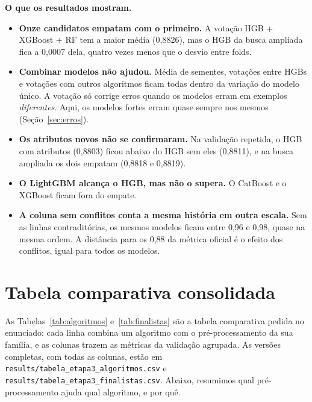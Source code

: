 \documentclass[11pt,a4paper]{article}
\begin{document}
\textbf{O que os resultados mostram.}
\begin{itemize}
\item \textbf{Onze candidatos empatam com o primeiro.} A votação HGB + XGBoost + RF tem a maior média (0,8826), mas o HGB da busca ampliada fica a 0,0007 dela, quatro vezes menos que o desvio entre folds.
\item \textbf{Combinar modelos não ajudou.} Média de sementes, votações entre HGBs e votações com outros algoritmos ficam todas dentro da variação do modelo único. A votação só corrige erros quando os modelos erram em exemplos \emph{diferentes}. Aqui, os modelos fortes erram quase sempre nos mesmos (Seção~\ref{sec:erros}).
\item \textbf{Os atributos novos não se confirmaram.} Na validação repetida, o HGB com atributos (0,8803) ficou abaixo do HGB sem eles (0,8811), e na busca ampliada os dois empatam (0,8818 e 0,8819).
\item \textbf{O LightGBM alcança o HGB, mas não o supera.} O CatBoost e o XGBoost ficam fora do empate.
\item \textbf{A coluna sem conflitos conta a mesma história em outra escala.} Sem as linhas contraditórias, os mesmos modelos ficam entre 0,96 e 0,98, quase na mesma ordem. A distância para os 0,88 da métrica oficial é o efeito dos conflitos, igual para todos os modelos.
\end{itemize}

\section{Tabela comparativa consolidada}

As Tabelas~\ref{tab:algoritmos} e~\ref{tab:finalistas} são a tabela comparativa pedida no enunciado: cada linha combina um algoritmo com o pré-processamento da sua família, e as colunas trazem as métricas da validação agrupada. As versões completas, com todas as colunas, estão em \texttt{results/tabela\_etapa3\_algoritmos.csv} e \texttt{results/tabela\_etapa3\_finalistas.csv}. Abaixo, resumimos qual pré-processamento ajuda qual algoritmo, e por quê.
\end{document}
